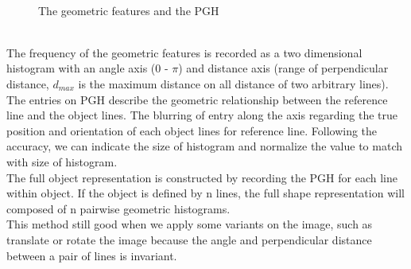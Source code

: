 \begin{figure}[h!]
\centering
{}~~
\caption{The geometric features and the PGH}
\label{fig:figure_31}
\end{figure}
\\[0.3cm]The frequency of the geometric features is recorded as a two dimensional histogram with an angle axis (0 - $\pi$) and distance axis (range of perpendicular distance, $d_{max}$ is the maximum distance on all distance of two arbitrary lines). The entries on PGH describe the geometric relationship between the reference line and the object lines. The blurring of entry along the axis regarding the true position and orientation of each object lines for reference line. Following the accuracy, we can indicate the size of histogram and normalize the value to match with size of histogram.
\\The full object representation is constructed by recording the PGH for each line within object. If the object is defined by n lines, the full shape representation will composed of n pairwise geometric histograms.\\
This method still good when we apply some variants on the image, such as translate or rotate the image because the angle and perpendicular distance between a pair of lines is invariant.

